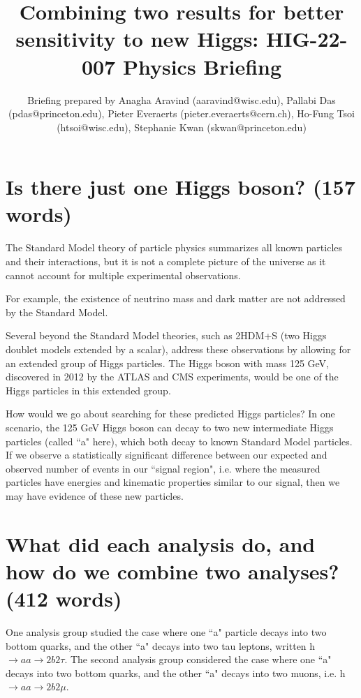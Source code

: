 \documentclass{article}
\title{Combining two results for better sensitivity to new Higgs: HIG-22-007 Physics Briefing}
\author{Briefing prepared by Anagha Aravind (aaravind@wisc.edu), Pallabi Das (pdas@princeton.edu), Pieter Everaerts (pieter.everaerts@cern.ch), Ho-Fung Tsoi (htsoi@wisc.edu), Stephanie Kwan (skwan@princeton.edu)}
\begin{document}
\maketitle


\section{Is there just one Higgs boson? (157 words)}

The Standard Model theory of particle physics summarizes all known particles and their interactions, but it is not a complete picture of the universe as it cannot account for multiple experimental observations. 

For example, the existence of neutrino mass and dark matter are not addressed by the Standard Model. 

Several beyond the Standard Model theories, such as 2HDM+S (two Higgs doublet models extended by a scalar), address these observations by allowing for an extended group of Higgs particles. The Higgs boson with mass 125 GeV, 
discovered in 2012 by the ATLAS and CMS experiments, would be one of the Higgs particles in this extended group. 

How would we go about searching for these predicted Higgs particles? In one scenario, the 125 GeV Higgs boson can decay to two new intermediate Higgs particles (called ``a" here),
which both decay to known Standard Model particles. If we observe a statistically significant difference between our expected and observed number of events in our ``signal region", i.e. where the measured particles have 
energies and kinematic properties similar to our signal, then we may have evidence of these new particles. 


\section{What did each analysis do, and how do we combine two analyses? (412 words)}

One analysis group studied the case where one ``a" particle decays into two bottom quarks, and the other ``a" decays into two tau leptons, written h $\rightarrow aa \rightarrow 2b2\tau$.
The second analysis group considered the case where one ``a" decays into two bottom quarks, and the other ``a" decays into two muons, i.e. h $\rightarrow aa \rightarrow 2b2\mu$. 
\end{document}
